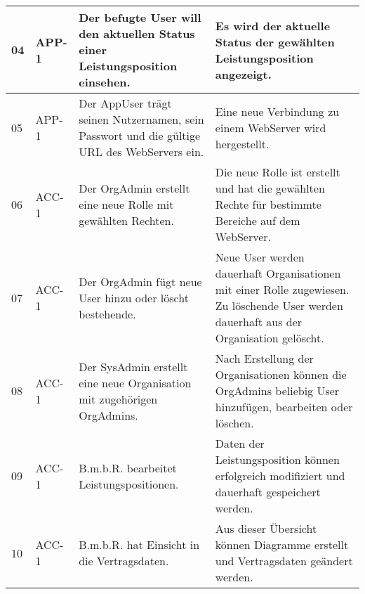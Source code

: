 \begin{longtable}[c]{|p{1cm}|p{3cm}|p{4cm}|p{6cm}|}
    04           & APP-1                      & Der befugte User will den aktuellen Status einer Leistungsposition einsehen.                                     & Es wird der aktuelle Status der gewählten Leistungsposition angezeigt.                                                                                                     \\ \hline
    05           & APP-1                      & Der AppUser trägt seinen Nutzernamen, sein Passwort und die gültige URL des WebServers ein.                        & Eine neue Verbindung zu einem WebServer wird hergestellt.                                                                                                                  \\ \hline
    06           & ACC-1                      & Der OrgAdmin erstellt eine neue Rolle mit gewählten Rechten.                                                       & Die neue Rolle ist erstellt und hat die gewählten Rechte für bestimmte Bereiche auf dem WebServer.                                                                         \\ \hline
    07           & ACC-1                      & Der OrgAdmin fügt neue User hinzu oder löscht bestehende.                                                        & Neue User werden dauerhaft Organisationen mit einer Rolle zugewiesen. Zu löschende User werden dauerhaft aus der Organisation gelöscht.                                \\ \hline
    08           & ACC-1                      & Der SysAdmin erstellt eine neue Organisation mit zugehörigen OrgAdmins.                                            & Nach Erstellung der Organisationen können die OrgAdmins beliebig User hinzufügen, bearbeiten oder löschen.                                                               \\ \hline
    09           & ACC-1                      & B.m.b.R. bearbeitet Leistungspositionen.                                                                           & Daten der Leistungsposition können erfolgreich modifiziert und dauerhaft gespeichert werden.                                                                               \\ \hline
    10           & ACC-1                      & B.m.b.R. hat Einsicht in die Vertragsdaten.                                                                        & Aus dieser Übersicht können Diagramme erstellt und Vertragsdaten geändert werden.                                                                                          \\ \hline

\end{longtable}
